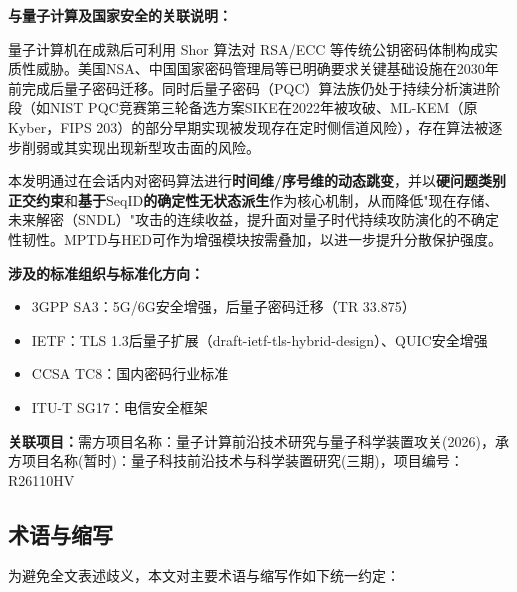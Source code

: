 ﻿\documentclass[12pt,a4paper]{article}
\begin{document}
\textbf{与量子计算及国家安全的关联说明：}

量子计算机在成熟后可利用 Shor 算法对 RSA/ECC 等传统公钥密码体制构成实质性威胁。美国NSA、中国国家密码管理局等已明确要求关键基础设施在2030年前完成后量子密码迁移。同时后量子密码（PQC）算法族仍处于持续分析演进阶段（如NIST PQC竞赛第三轮备选方案SIKE在2022年被攻破、ML-KEM（原Kyber，FIPS 203）的部分早期实现被发现存在定时侧信道风险），存在算法被逐步削弱或其实现出现新型攻击面的风险。

本发明通过在会话内对密码算法进行\textbf{时间维/序号维的动态跳变}，并以\textbf{硬问题类别正交约束}和\textbf{基于$\text{SeqID}$的确定性无状态派生}作为核心机制，从而降低"现在存储、未来解密（SNDL）"攻击的连续收益，提升面对量子时代持续攻防演化的不确定性韧性。MPTD与HED可作为增强模块按需叠加，以进一步提升分散保护强度。

\textbf{涉及的标准组织与标准化方向：}
\begin{itemize}[noitemsep]
    \item 3GPP SA3：5G/6G安全增强，后量子密码迁移（TR 33.875）
    \item IETF：TLS 1.3后量子扩展（draft-ietf-tls-hybrid-design）、QUIC安全增强
    \item CCSA TC8：国内密码行业标准
    \item ITU-T SG17：电信安全框架
\end{itemize}

\textbf{关联项目：}需方项目名称：量子计算前沿技术研究与量子科学装置攻关(2026)，承方项目名称(暂时)：量子科技前沿技术与科学装置研究(三期)，项目编号：R26110HV

\subsection*{术语与缩写}

为避免全文表述歧义，本文对主要术语与缩写作如下统一约定：
\end{document}
